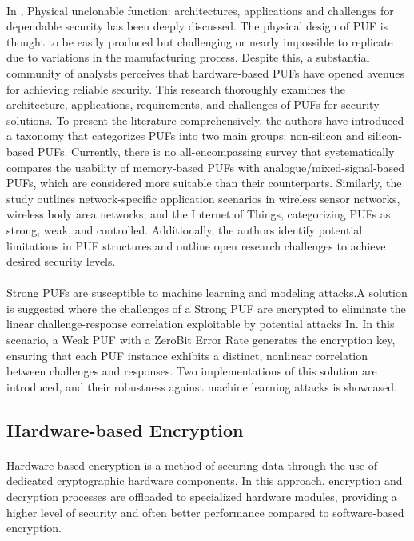  \paragraph*{}
 In \cite{https://doi.org/10.1049/iet-cds.2019.0175}, Physical unclonable function: architectures, applications and challenges for dependable security has been deeply discussed. The physical design of PUF is thought to be easily produced but challenging or nearly impossible to replicate due to variations in the manufacturing process. Despite this, a substantial community of analysts perceives that hardware-based PUFs have opened avenues for achieving reliable security. This research thoroughly examines the architecture, applications, requirements, and challenges of PUFs for security solutions. To present the literature comprehensively, the authors have introduced a taxonomy that categorizes PUFs into two main groups: non-silicon and silicon-based PUFs. Currently, there is no all-encompassing survey that systematically compares the usability of memory-based PUFs with analogue/mixed-signal-based PUFs, which are considered more suitable than their counterparts. Similarly, the study outlines network-specific application scenarios in wireless sensor networks, wireless body area networks, and the Internet of Things, categorizing PUFs as strong, weak, and controlled. Additionally, the authors identify potential limitations in PUF structures and outline open research challenges to achieve desired security levels.
 \paragraph*{}
 Strong PUFs are susceptible to machine learning and modeling attacks.A solution is suggested where the challenges of a Strong PUF are encrypted to eliminate the linear challenge-response correlation exploitable by potential attacks In\cite{8854387}. In this scenario, a Weak PUF with a ZeroBit Error Rate generates the encryption key, ensuring that each PUF instance exhibits a distinct, nonlinear correlation between challenges and responses. Two implementations of this solution are introduced, and their robustness against machine learning attacks is showcased. 
 \subsection{Hardware-based Encryption}
 \paragraph*{}
 Hardware-based encryption is a method of securing data through the use of dedicated cryptographic hardware components. In this approach, encryption and decryption processes are offloaded to specialized hardware modules, providing a higher level of security and often better performance compared to software-based encryption.
